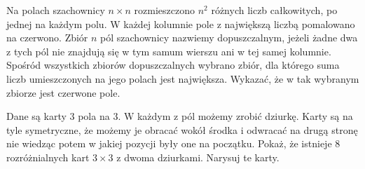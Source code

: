 \documentclass{article}
\begin{document}

\begin{zadanie}
  Na polach szachownicy $n\times n$ rozmieszczono $n^2$ różnych liczb całkowitych, po jednej na każdym polu. W każdej kolumnie pole z największą liczbą pomalowano na czerwono. Zbiór $n$ pól szachownicy nazwiemy dopuszczalnym, jeżeli żadne dwa z tych pól nie znajdują się w tym samum wierszu ani w tej samej kolumnie. Spośród wszystkich zbiorów dopuszczalnych wybrano zbiór, dla którego suma liczb umieszczonych na jego polach jest największa. Wykazać, że w tak wybranym zbiorze jest czerwone pole.
\end{zadanie}


\begin{zadanie}
  Dane są karty $3$ pola na $3$. W każdym z pól możemy zrobić dziurkę. Karty są na tyle symetryczne, że możemy je obracać wokół środka i odwracać na drugą stronę nie wiedząc potem w jakiej pozycji były one na początku. Pokaż, że istnieje $8$ rozróżnialnych kart $3\times 3$ z dwoma dziurkami. Narysuj te karty.
\end{zadanie}

\end{document}
